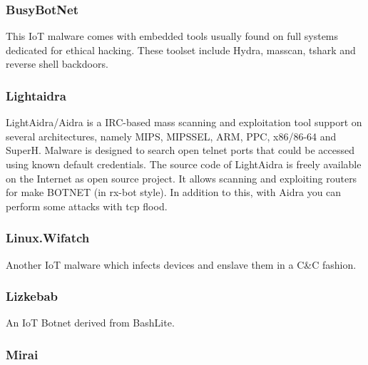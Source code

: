 \subsubsection{BusyBotNet}

This IoT malware comes with embedded tools usually found on full systems dedicated for ethical hacking. These toolset include Hydra, masscan, tshark and reverse shell backdoors.

\subsubsection{Lightaidra}

LightAidra/Aidra is a IRC-based mass scanning and exploitation tool support on several architectures, namely MIPS, MIPSSEL, ARM, PPC, x86/86-64 and SuperH. Malware is designed to search open telnet ports that could be accessed using known default credentials. The source code of LightAidra is freely available on the Internet as open source project. It allows scanning and exploiting routers for make BOTNET (in rx-bot style). In addition to this, with Aidra you can perform some attacks with tcp flood.

\subsubsection{Linux.Wifatch}

Another IoT malware which infects devices and enslave them in a C\&C fashion.

\subsubsection{Lizkebab}

An IoT Botnet derived from BashLite.

\subsubsection{Mirai}

